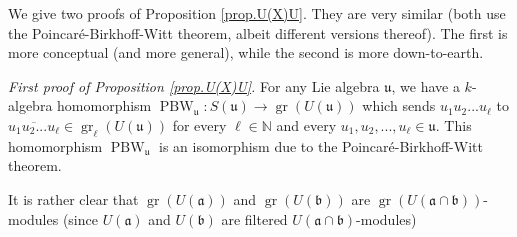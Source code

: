 \documentclass
[numbers=enddot,12pt,final,onecolumn,german,notitlepage]{scrartcl}%
\theoremstyle{definition}
\newenvironment{verlong}{}{}
\begin{document}
We give two proofs of Proposition \ref{prop.U(X)U}. They are very similar
(both use the Poincar\'{e}-Birkhoff-Witt theorem, albeit different versions
thereof). The first is more conceptual (and more general), while the second is
more down-to-earth.

\textit{First proof of Proposition \ref{prop.U(X)U}.} For any Lie algebra
$\mathfrak{u}$, we have a $k$-algebra homomorphism $\operatorname*{PBW}%
\nolimits_{\mathfrak{u}}:S\left(  \mathfrak{u}\right)  \rightarrow
\operatorname*{gr}\left(  U\left(  \mathfrak{u}\right)  \right)  $ which sends
$u_{1}u_{2}...u_{\ell}$ to $\overline{u_{1}u_{2}...u_{\ell}}\in
\operatorname*{gr}\nolimits_{\ell}\left(  U\left(  \mathfrak{u}\right)
\right)  $ for every $\ell\in\mathbb{N}$ and every $u_{1},u_{2},...,u_{\ell
}\in\mathfrak{u}$. This homomorphism $\operatorname*{PBW}%
\nolimits_{\mathfrak{u}}$ is an isomorphism due to the
Poincar\'{e}-Birkhoff-Witt theorem.

\begin{verlong}
It is rather clear that $\operatorname*{gr}\left(  U\left(  \mathfrak{a}%
\right)  \right)  $ and $\operatorname*{gr}\left(  U\left(  \mathfrak{b}%
\right)  \right)  $ are $\operatorname*{gr}\left(  U\left(  \mathfrak{a}%
\cap\mathfrak{b}\right)  \right)  $-modules (since $U\left(  \mathfrak{a}%
\right)  $ and $U\left(  \mathfrak{b}\right)  $ are filtered $U\left(
\mathfrak{a}\cap\mathfrak{b}\right)  $-modules)
\end{verlong}
\end{document}
